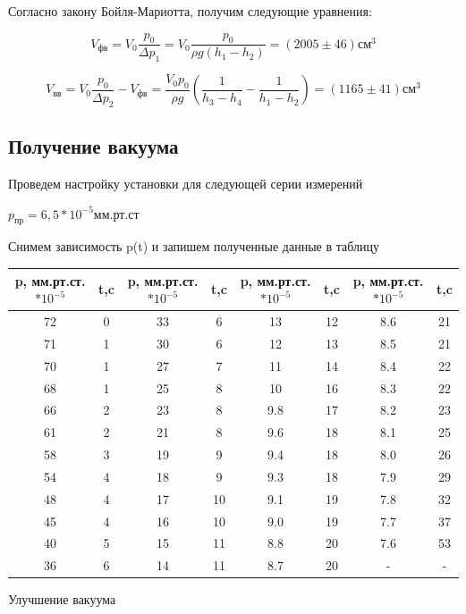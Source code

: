 \documentclass[12pt,a4paper]{article}
\begin{document}
\begin{enumerate}
Согласно закону Бойля-Мариотта, получим следующие уравнения:

\begin{equation}
V_{\text{фв}} = V_{0}\frac{p_{0}}{\Delta{p}_{1}} = V_{0}\frac{p_{0}}{\rho{g}(h_{1}-h_{2})} = (2005 \pm 46)\text{см}^3
\end{equation}

\begin{equation}
V_{\text{вв}} = V_{0}\frac{p_{0}}{\Delta{p}_{2}} - V_{\text{фв}} = \frac{V_{0}p_{0}}{\rho{g}}(\frac{1}{h_{3}-h_{4}}-\frac{1}{h_{1}-h_{2}}) = (1165 \pm 41)\text{см}^3
\end{equation}

\subsection{Получение вакуума}

Проведем настройку установки для следующей серии измерений

$p_{\text{пр}} = 6,5*10^{-5}$мм.рт.ст 

Снимем зависимость p(t) и запишем полученные данные в таблицу

\begin{center}
\begin{tabular}{|c|c|c|c|c|c|c|c|}
\hline 
p, мм.рт.ст.$*10^{-5}$ & t,c  & p, мм.рт.ст.$*10^{-5}$ & t,c  & p, мм.рт.ст.$*10^{-5}$ & t,c  & p, мм.рт.ст.$*10^{-5}$ & t,c  \\ 
\hline 
72 & 0 & 33 & 6 & 13 & 12 & 8.6 & 21 \\ 
\hline 
71 & 1 & 30 & 6 & 12 & 13 & 8.5 & 21 \\ 
\hline 
70 & 1 & 27 & 7 & 11 & 14 & 8.4 & 22 \\ 
\hline 
68 & 1 & 25 & 8 & 10 & 16 & 8.3 & 22 \\ 
\hline 
66 & 2 & 23 & 8 & 9.8 & 17 & 8.2 & 23 \\ 
\hline 
61 & 2 & 21 & 8 & 9.6 & 18 & 8.1 & 25 \\ 
\hline 
58 & 3 & 19 & 9 & 9.4 & 18 & 8.0 & 26 \\ 
\hline 
54 & 4 & 18 & 9 & 9.3 & 18 & 7.9 & 29 \\ 
\hline 
48 & 4 & 17 & 10 & 9.1 & 19 & 7.8 & 32 \\ 
\hline 
45 & 4 & 16 & 10 & 9.0 & 19 & 7.7 & 37 \\ 
\hline 
40 & 5 & 15 & 11 & 8.8 & 20 & 7.6 & 53 \\ 
\hline 
36 & 6 & 14 & 11 & 8.7 & 20 & - & - \\ 
\hline 
\end{tabular} 
Улучшение вакуума
\end{center}


\end{enumerate}
\end{document}
